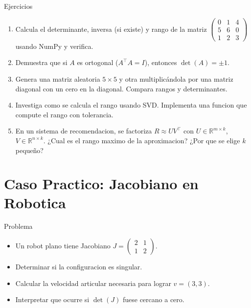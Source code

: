 \documentclass[aspectratio=169, 10pt, xcolor=table]{beamer}
\begin{document}
\begin{frame}{Ejercicios}
    \begin{enumerate}
        \item Calcula el determinante, inversa (si existe) y rango de la matriz $\begin{pmatrix}0&1&4\\5&6&0\\1&2&3\end{pmatrix}$ usando NumPy y verifica.
        \item Demuestra que si $A$ es ortogonal ($A^\top A = I$), entonces $\det(A) = \pm 1$.
        \item Genera una matriz aleatoria $5\times5$ y otra multiplicándola por una matriz diagonal con un cero en la diagonal. Compara rangos y determinantes.
        \item Investiga como se calcula el rango usando SVD. Implementa una funcion que compute el rango con tolerancia.
        \item En un sistema de recomendacion, se factoriza $R \approx UV^\top$ con $U\in\mathbb{R}^{m\times k}$, $V\in\mathbb{R}^{n\times k}$. ¿Cual es el rango maximo de la aproximacion? ¿Por que se elige $k$ pequeño?
    \end{enumerate}
\end{frame}

\section{Caso Practico: Jacobiano en Robotica}

\begin{frame}{Problema}
    \begin{itemize}
        \item Un robot plano tiene Jacobiano $J = \begin{pmatrix}2&1\\1&2\end{pmatrix}$.
        \item Determinar si la configuracion es singular.
        \item Calcular la velocidad articular necesaria para lograr $v = (3,3)$.
        \item Interpretar que ocurre si $\det(J)$ fuese cercano a cero.
    \end{itemize}
\end{frame}
\end{document}
